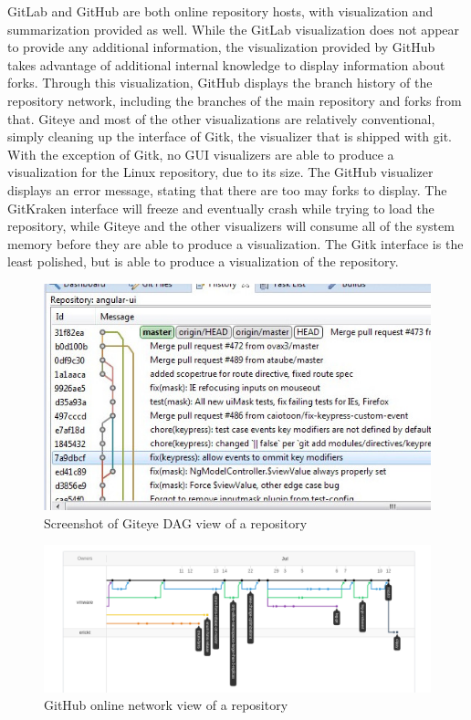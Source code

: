 GitLab and GitHub are both online repository hosts, with
visualization and summarization provided as well. While the GitLab
visualization does not appear to provide any additional information, the
visualization provided by GitHub takes advantage of additional internal
knowledge to display information about forks. Through this
visualization, GitHub displays the branch history of the repository
network, including the branches of the main repository and forks from
that. Giteye and most of the other visualizations are relatively
conventional, simply cleaning up the interface of Gitk, the visualizer
that is shipped with git. With the exception of Gitk, no GUI visualizers
are able to produce a visualization for the Linux repository, due to its
size. The GitHub visualizer displays an error message, stating that
there are too may forks to display. The GitKraken interface will freeze
and eventually crash while trying to load the repository, while Giteye
and the other visualizers will consume all of the system memory before
they are able to produce a visualization. The Gitk interface is the
least polished, but is able to produce a visualization of the
repository.

\begin{figure}[htpb]
  \centering
  \includegraphics[width=0.8\linewidth]{Figures/introduction/giteye_graph.jpg}
  \caption{Screenshot of Giteye DAG view of a repository}
  \label{fig:giteye_screenshot}
\end{figure}

\begin{figure}[htpb]
  \centering
  \includegraphics[width=0.8\linewidth]{Figures/introduction/github_dag.png}
  \caption{GitHub online network view of a repository}
  \label{fig:github_dag_screenshot}
\end{figure}


